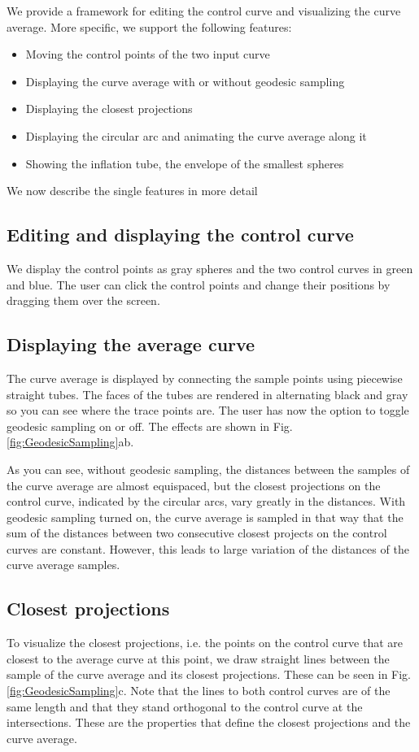 \documentclass[journal, letterpaper]{IEEEtran}
\begin{document}
We provide a framework for editing the control curve and visualizing the curve average.
More specific, we support the following features: 
\begin{itemize}
	\item Moving the control points of the two input curve
	\item Displaying the curve average with or without geodesic sampling
	\item Displaying the closest projections
	\item Displaying the circular arc and animating the curve average along it
	\item Showing the inflation tube, the envelope of the smallest spheres
\end{itemize}
We now describe the single features in more detail

\subsection{Editing and displaying the control curve}
We display the control points as gray spheres and the two control curves in green and blue.
The user can click the control points and change their positions by dragging them over the screen.

\subsection{Displaying the average curve}
The curve average is displayed by connecting the sample points using piecewise straight tubes. The faces of the tubes are rendered in alternating black and gray so you can see where the trace points are.
The user has now the option to toggle geodesic sampling on or off. The effects are shown in Fig.\ref{fig:GeodesicSampling}ab. 

As you can see, without geodesic sampling, the distances between the samples of the curve average are almost equispaced, but the closest projections on the control curve, indicated by the circular arcs, vary greatly in the distances. With geodesic sampling turned on, the curve average is sampled in that way that the sum of the distances between two consecutive closest projects on the control curves are constant. However, this leads to large variation of the distances of the curve average samples.

\subsection{Closest projections}
To visualize the closest projections, i.e. the points on the control curve that are closest to the average curve at this point, we draw straight lines between the sample of the curve average and its closest projections. These can be seen in Fig.\ref{fig:GeodesicSampling}c. Note that the lines to both control curves are of the same length and that they stand orthogonal to the control curve at the intersections. These are the properties that define the closest projections and the curve average.
\end{document}
